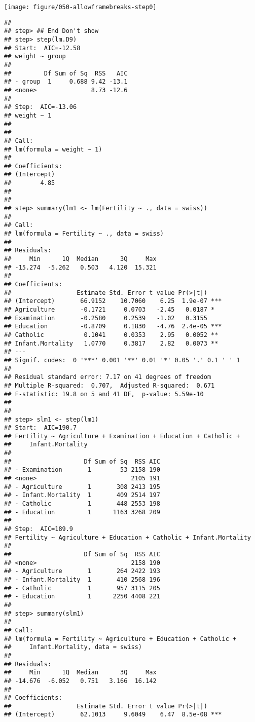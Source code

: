 \documentclass{beamer}\usepackage[]{graphicx}\usepackage[]{color}
\newenvironment{knitrout}{}{} %
\begin{document}
\begin{frame}
\begin{knitrout}
\texttt{[image: figure/050-allowframebreaks-step0]} 
\begin{verbatim}
## 
## step> ## End Don't show
## step> step(lm.D9)
## Start:  AIC=-12.58
## weight ~ group
## 
##         Df Sum of Sq  RSS   AIC
## - group  1     0.688 9.42 -13.1
## <none>               8.73 -12.6
## 
## Step:  AIC=-13.06
## weight ~ 1
## 
## 
## Call:
## lm(formula = weight ~ 1)
## 
## Coefficients:
## (Intercept)  
##        4.85  
## 
## 
## step> summary(lm1 <- lm(Fertility ~ ., data = swiss))
## 
## Call:
## lm(formula = Fertility ~ ., data = swiss)
## 
## Residuals:
##     Min      1Q  Median      3Q     Max 
## -15.274  -5.262   0.503   4.120  15.321 
## 
## Coefficients:
##                  Estimate Std. Error t value Pr(>|t|)    
## (Intercept)       66.9152    10.7060    6.25  1.9e-07 ***
## Agriculture       -0.1721     0.0703   -2.45   0.0187 *  
## Examination       -0.2580     0.2539   -1.02   0.3155    
## Education         -0.8709     0.1830   -4.76  2.4e-05 ***
## Catholic           0.1041     0.0353    2.95   0.0052 ** 
## Infant.Mortality   1.0770     0.3817    2.82   0.0073 ** 
## ---
## Signif. codes:  0 '***' 0.001 '**' 0.01 '*' 0.05 '.' 0.1 ' ' 1
## 
## Residual standard error: 7.17 on 41 degrees of freedom
## Multiple R-squared:  0.707,	Adjusted R-squared:  0.671 
## F-statistic: 19.8 on 5 and 41 DF,  p-value: 5.59e-10
## 
## 
## step> slm1 <- step(lm1)
## Start:  AIC=190.7
## Fertility ~ Agriculture + Examination + Education + Catholic + 
##     Infant.Mortality
## 
##                    Df Sum of Sq  RSS AIC
## - Examination       1        53 2158 190
## <none>                          2105 191
## - Agriculture       1       308 2413 195
## - Infant.Mortality  1       409 2514 197
## - Catholic          1       448 2553 198
## - Education         1      1163 3268 209
## 
## Step:  AIC=189.9
## Fertility ~ Agriculture + Education + Catholic + Infant.Mortality
## 
##                    Df Sum of Sq  RSS AIC
## <none>                          2158 190
## - Agriculture       1       264 2422 193
## - Infant.Mortality  1       410 2568 196
## - Catholic          1       957 3115 205
## - Education         1      2250 4408 221
## 
## step> summary(slm1)
## 
## Call:
## lm(formula = Fertility ~ Agriculture + Education + Catholic + 
##     Infant.Mortality, data = swiss)
## 
## Residuals:
##     Min      1Q  Median      3Q     Max 
## -14.676  -6.052   0.751   3.166  16.142 
## 
## Coefficients:
##                  Estimate Std. Error t value Pr(>|t|)    
## (Intercept)       62.1013     9.6049    6.47  8.5e-08 ***

\end{verbatim}
\end{knitrout}
\end{frame}
\end{document}
